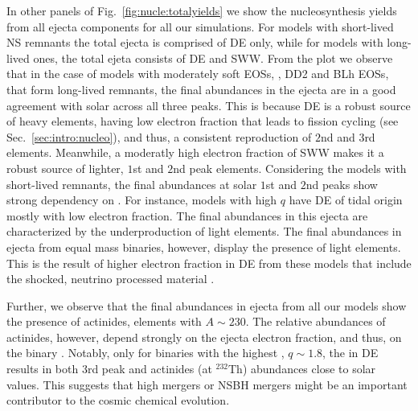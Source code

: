 In other panels of Fig.~\ref{fig:nucle:totalyields}
we show the nucleosynthesis yields from all ejecta components for all our simulations. 
For models with short-lived \ac{NS} remnants the total ejecta is comprised 
of \ac{DE} only, while for models with long-lived ones, the total ejeta 
consists of \ac{DE} and \ac{SWW}. 
%
%
%
%
From the plot we observe that in the case of models with moderately soft 
\acp{EOS}, \eg, DD2 and BLh \acp{EOS}, that form long-lived 
remnants, the final \rproc{} abundances in the ejecta are in a good agreement 
with solar across all three \rproc{} peaks. 
This is because \ac{DE} is a robust source of heavy elements, having low 
electron fraction that leads to fission cycling (see Sec.~\ref{sec:intro:nucleo}),
and thus, a consistent reproduction of $2$nd and $3$rd \rproc{} elements. 
Meanwhile, a moderatly high electron fraction of \ac{SWW} makes it a robust source of 
lighter, $1$st and $2$nd peak elements. 
%
Considering the models with short-lived remnants, the final \rproc{} abundances 
at solar $1$st and $2$nd \rproc{} peaks show 
strong dependency on \mr{}. 
For instance, models with high $q$ have \ac{DE} of tidal origin mostly with low 
electron fraction. The final \rproc{} abundances in this ejecta are characterized
by the underproduction of light elements. 
The final abundances in ejecta from equal mass binaries, 
however, display the presence of light \rproc{} elements. 
This is the result of higher electron fraction in \ac{DE} from these models 
that include the shocked, neutrino processed material 
\citep{Wanajo:2014wha,Radice:2018pdn}. 

Further, we observe that the final abundances in ejecta from all our models show 
the presence of actinides, elements with $A \sim 230$. 
The relative abundances of actinides, however, depend strongly on the ejecta 
electron fraction, and thus, on the binary \mr{}.
Notably, only for binaries with the highest \mr{}, $q\sim1.8$, the 
\rproc{} in \ac{DE} results in both $3$rd peak and actinides (at $^{232}$Th) abundances 
close to solar values. 
This suggests that  high \mr{} mergers or \ac{NSBH} mergers might be an 
important contributor to the cosmic chemical evolution.




